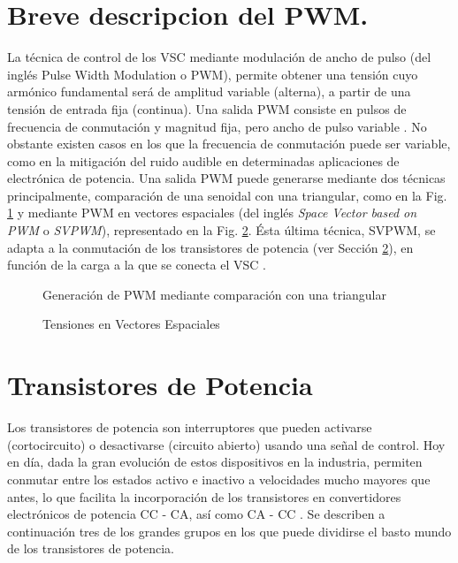\documentclass{report}
\begin{document}
\section{Breve descripcion del PWM.}\label{sec.brevedescripcionpwm}

La técnica de control de los VSC mediante modulación de ancho de pulso (del inglés Pulse Width Modulation o PWM), permite obtener una tensión cuyo armónico fundamental será de amplitud variable (alterna), a partir de una tensión de entrada fija (continua). Una salida PWM consiste en pulsos de frecuencia de conmutación y magnitud fija, pero ancho de pulso variable \cite{veintiseis}. No obstante existen casos en los que la frecuencia de conmutación puede ser variable, como en la mitigación del ruido audible en determinadas aplicaciones de electrónica de potencia. Una salida PWM puede generarse mediante dos técnicas principalmente, comparación de una senoidal con una triangular, como en la Fig. \ref{fig.triangular_senoidal} y mediante PWM en vectores espaciales (del inglés \textit{Space Vector based on PWM} o \textit{SVPWM}), representado en la Fig. \ref{fig.SVPWM}. Ésta última técnica, SVPWM, se adapta a la conmutación de los transistores de potencia (ver Sección \ref{sec.semiconductores}), en función de la carga a la que se conecta el VSC \cite{veintiocho}.

\begin{figure}[!h]
    \begin{center}
    \end{center}
    \caption{Generación de PWM mediante comparación con una triangular \cite{veintisiete}}
    \label{fig.triangular_senoidal}
    \end{figure}

\begin{figure}[!h]
        \begin{center}
        \end{center}
        \caption{Tensiones en Vectores Espaciales \cite{veintiocho}}
        \label{fig.SVPWM}
        \end{figure}   

\clearpage
\section{Transistores de Potencia} \label{sec.semiconductores}

Los transistores de potencia son interruptores que pueden activarse (cortocircuito) o desactivarse (circuito abierto) usando una señal de control. Hoy en día, dada la gran evolución de estos dispositivos en la industria, permiten conmutar entre los estados activo e inactivo a velocidades mucho mayores que antes, lo que facilita la incorporación de los transistores en convertidores electrónicos de potencia CC - CA, así como CA - CC \cite{dieciocho}. Se describen a continuación tres de los grandes grupos en los que puede dividirse el basto mundo de los transistores de potencia. 
\end{document}
